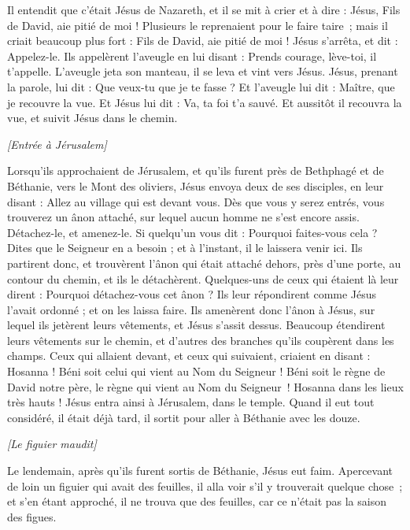 \begin{multicols}{2}
Il entendit que c'était Jésus de Nazareth, et il se mit à crier et à dire : Jésus, Fils de David, aie pitié de moi !
Plusieurs le reprenaient pour le faire taire ; mais il criait beaucoup plus fort : Fils de David, aie pitié de moi !
Jésus s’arrêta, et dit : Appelez-le. Ils appelèrent l’aveugle en lui disant : Prends courage, lève-toi, il t'appelle.
L’aveugle jeta son manteau, il se leva et vint vers Jésus.
Jésus, prenant la parole, lui dit : Que veux-tu que je te fasse ? Et l'aveugle lui dit : Maître, que je recouvre la vue.
Et Jésus lui dit : Va, ta foi t'a sauvé.
Et aussitôt il recouvra la vue, et suivit Jésus dans le chemin.
\begin{center}
\textit{[Entrée à Jérusalem]}
\end{center}
\VerseOne{}Lorsqu’ils approchaient de Jérusalem, et qu’ils furent près de Bethphagé et de Béthanie, vers le Mont des oliviers, Jésus envoya deux de ses disciples,
en leur disant : Allez au village qui est devant vous. Dès que vous y serez entrés, vous trouverez un ânon attaché, sur lequel aucun homme ne s’est encore assis. Détachez-le, et amenez-le.
Si quelqu'un vous dit : Pourquoi faites-vous cela ? Dites que le Seigneur en a besoin ; et à l’instant, il le laissera venir ici.
Ils partirent donc, et trouvèrent l'ânon qui était attaché dehors, près d’une porte, au contour du chemin, et ils le détachèrent.
Quelques-uns de ceux qui étaient là leur dirent : Pourquoi détachez-vous cet ânon ?
Ils leur répondirent comme Jésus l’avait ordonné ; et on les laissa faire.
Ils amenèrent donc l'ânon à Jésus, sur lequel ils jetèrent leurs vêtements, et Jésus s’assit dessus.
Beaucoup étendirent leurs vêtements sur le chemin, et d'autres des branches qu’ils coupèrent dans les champs.
Ceux qui allaient devant, et ceux qui suivaient, criaient en disant : Hosanna ! Béni soit celui qui vient au Nom du Seigneur !
Béni soit le règne de David notre père, le règne qui vient au Nom du Seigneur ! Hosanna dans les lieux très hauts !
Jésus entra ainsi à Jérusalem, dans le temple. Quand il eut tout considéré, il était déjà tard, il sortit pour aller à Béthanie avec les douze.
\begin{center}
\textit{[Le figuier maudit]}
\end{center}
\PPE{}
Le lendemain, après qu’ils furent sortis de Béthanie, Jésus eut faim.
Apercevant de loin un figuier qui avait des feuilles, il alla voir s'il y trouverait quelque chose ; et s’en étant approché, il ne trouva que des feuilles, car ce n'était pas la saison des figues.

\end{multicols}
